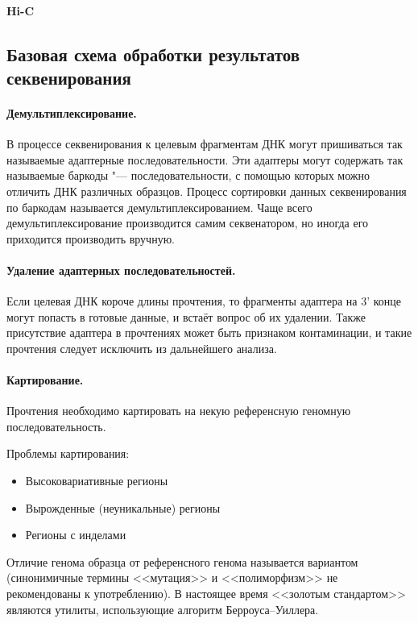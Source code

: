 \documentclass[a4paper,12pt]{article}
\begin{document}
\paragraph{Hi-C}

\subsection{Базовая схема обработки результатов секвенирования}

\paragraph{Демультиплексирование.}
В процессе секвенирования к целевым фрагментам ДНК могут пришиваться так называемые адаптерные последовательности.
Эти адаптеры могут содержать так называемые баркоды "--- последовательности, с помощью которых можно отличить ДНК различных образцов.
Процесс сортировки данных секвенирования по баркодам называется демультиплексированием.
Чаще всего демультиплексирование производится самим секвенатором, но иногда его приходится производить вручную.

\paragraph{Удаление адаптерных последовательностей.}
Если целевая ДНК короче длины прочтения, то фрагменты адаптера на 3' конце могут попасть в готовые данные, и встаёт вопрос об их удалении.
Также присутствие адаптера в прочтениях может быть признаком контаминации, и такие прочтения следует исключить из дальнейшего анализа\cite{cutadapt}.

\paragraph{Картирование.}
Прочтения необходимо картировать на некую референсную геномную последовательность.

Проблемы картирования:

\begin{itemize}
\item Высоковариативные регионы
\item Вырожденные (неуникальные) регионы
\item Регионы с инделами
\end{itemize}

Отличие генома образца от референсного генома называется вариантом (синонимичные термины <<мутация>> и <<полиморфизм>> не рекомендованы к употреблению\cite{richards}).
В настоящее время <<золотым стандартом>> являются утилиты, использующие алгоритм Берроуса--Уиллера\cite{burrows}.
\end{document}
